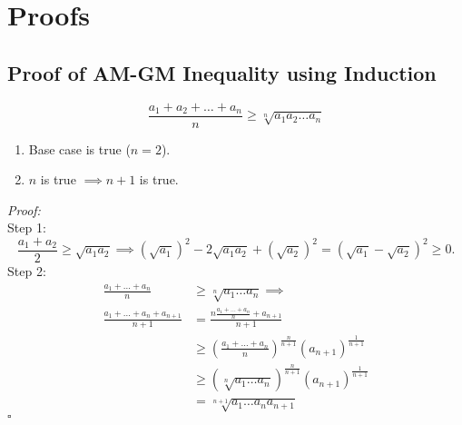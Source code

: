 \documentclass[a4paper,11pt]{article}
\begin{document}
\section{Proofs}
\subsection{Proof of AM-GM Inequality using Induction}
\begin{tcolorbox}[breakable]
    \[
    \frac{a_1 + a_2 + \dots + a_n}{n} \geq \sqrt[n]{a_1 a_2 \dots a_n}
    \]
    \begin{enumerate}[label=\roman*.]
        \item Base case is true ($n=2$).
        \item $n$ is true $\implies n+1$ is true.
    \end{enumerate}
    \emph{Proof:} \\[6pt]
    Step 1:
    \[
    \frac{a_1 + a_2}{2} \geq \sqrt{a_1 a_2} \implies (\sqrt{a_1})^2 - 2\sqrt{a_1 a_2} + (\sqrt{a_2})^2 = (\sqrt{a_1} - \sqrt{a_2})^2 \geq 0.
    \]
    Step 2:
    \begin{align*}
        \frac{a_1 + \dots + a_n}{n} &\geq \sqrt[n]{a_1 \dots a_n} \implies\\
        \frac{a_1 + \dots + a_n + a_{n+1}}{n+1} &= \frac{ n \frac{a_1 + \dots + a_n}{n} + a_{n+1}}{n+1} \\  &\geq \left( \frac{a_1 + \dots + a_n}{n} \right)^{\frac{n}{n+1}} (a_{n+1})^{\frac{1}{n+1}} \\
        &\geq \left( \sqrt[n]{a_1 \dots a_n} \right)^{\frac{n}{n+1}} (a_{n+1})^{\frac{1}{n+1}} \\
        &= \sqrt[n+1]{a_1 \dots a_n a_{n+1}} 
    \end{align*}
    \hfill$\square$
\end{tcolorbox}
\end{document}
